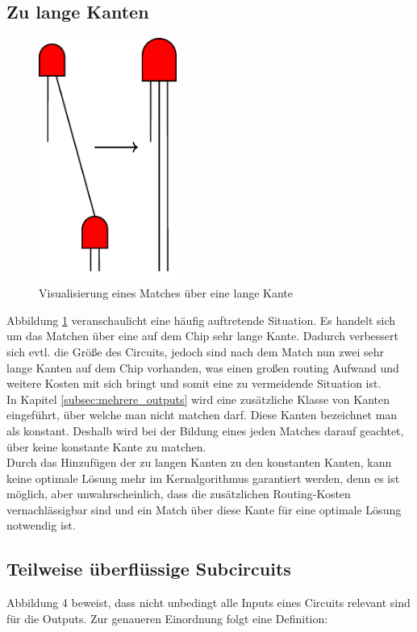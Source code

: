 \documentclass[11pt, a4paper, german]{article}
\begin{document}
\newpage
\subsection{Zu lange Kanten}
\label{subsec:zu_lange_kanten}
 \begin{figure}
		\includegraphics[height = 8cm]{pictures/compiled/zu_lange_kante}
		\caption{Visualisierung eines Matches über eine lange Kante}
		\label{bild:zu_lange_kanten}
\end{figure}
Abbildung \ref{bild:zu_lange_kanten} veranschaulicht eine häufig auftretende Situation. Es handelt sich um das Matchen über eine auf dem Chip sehr lange Kante. Dadurch verbessert sich evtl. die Größe des Circuits, jedoch sind nach dem Match nun zwei sehr lange Kanten auf dem Chip vorhanden, was   einen großen routing Aufwand und weitere Kosten mit sich bringt und somit eine zu vermeidende Situation ist. \\
In Kapitel \ref{subsec:mehrere_outputs} wird eine zusätzliche Klasse von Kanten eingeführt, über welche man nicht matchen darf.
Diese Kanten bezeichnet man als konstant.
Deshalb wird bei der Bildung eines jeden Matches darauf geachtet, über keine konstante Kante zu matchen.\\
Durch das Hinzufügen der zu langen Kanten zu den konstanten Kanten, kann keine optimale Lösung mehr im Kernalgorithmus garantiert werden, denn es ist möglich, aber unwahrscheinlich, dass die zusätzlichen Routing-Kosten vernachlässigbar sind und ein Match über diese Kante für eine optimale Lösung notwendig ist. \\

 \subsection{Teilweise überflüssige Subcircuits}
 \label{subsec:teilweise_ueberfkl_subcircuits}
 Abbildung 4 beweist, dass nicht unbedingt alle Inputs eines Circuits relevant sind für die Outputs. Zur genaueren Einordnung folgt eine Definition:
 
\end{document}
